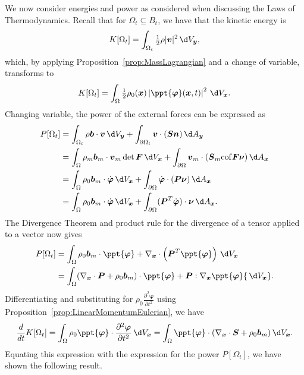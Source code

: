 \documentclass[
  letterpaper,
  DIV=11,
  numbers=noendperiod]{scrreprt}
\theoremstyle{plain}
\theoremstyle{remark}
\begin{document}
We now consider energies and power as considered when discussing the
Laws of Thermodynamics. Recall that for \(\Omega_t\subseteq B_t\), we
have that the kinetic energy is
\[K[\Omega_t] = \int_{\Omega_t}\tfrac12\rho|{\boldsymbol{v}}|^2{\,\d V_{{\boldsymbol{y}}}},\]
which, by applying
Proposition~\hyperref[prop:MassLagrangian]{{[}prop:MassLagrangian{]}}
and a change of variable, transforms to
\[K[\Omega_t] = \int_\Omega \tfrac12\rho_0({\boldsymbol{x}})\left|\ppt{\boldsymbol{\varphi}}({\boldsymbol{x}},t)\right|^2{\,\d V_{{\boldsymbol{x}}}}.\]
Changing variable, the power of the external forces can be expressed as
\[\begin{aligned}
  P[\Omega_t]
  &= \int_{\Omega_t}\rho{\boldsymbol{b}}\cdot{\boldsymbol{v}}{\,\d V_{{\boldsymbol{y}}}}+\int_{\partial\Omega_t}{\boldsymbol{v}}\cdot({\boldsymbol{S}}{\boldsymbol{n}}){\,\d A_{{\boldsymbol{y}}}}\\
  &= \int_{\Omega}\rho_m{\boldsymbol{b}}_m\cdot{\boldsymbol{v}}_m\det{\boldsymbol{F}}{\,\d V_{{\boldsymbol{x}}}}+\int_{\partial\Omega}{\boldsymbol{v}}_m\cdot({\boldsymbol{S}}_m{\operatorname{cof}}{\boldsymbol{F}}{\boldsymbol{\nu}}){\,\d A_{{\boldsymbol{x}}}}\\
  &= \int_{\Omega}\rho_0{\boldsymbol{b}}_m\cdot\dot{\boldsymbol{\varphi}}{\,\d V_{{\boldsymbol{x}}}}+\int_{\partial\Omega}\dot{\boldsymbol{\varphi}}\cdot({\boldsymbol{P}}{\boldsymbol{\nu}}){\,\d A_{{\boldsymbol{x}}}}\\
  &= \int_{\Omega}\rho_0{\boldsymbol{b}}_m\cdot\dot{\boldsymbol{\varphi}}{\,\d V_{{\boldsymbol{x}}}}+\int_{\partial\Omega}({\boldsymbol{P}}^T\dot{\boldsymbol{\varphi}})\cdot{\boldsymbol{\nu}}{\,\d A_{{\boldsymbol{x}}}}.
\end{aligned}\] The Divergence Theorem and product rule for the
divergence of a tensor applied to a vector now gives \[\begin{aligned}
  P[\Omega_t]
  &= \int_{\Omega}\rho_0{\boldsymbol{b}}_m\cdot\ppt{\boldsymbol{\varphi}}+\nabla_{\boldsymbol{x}}\cdot\left({\boldsymbol{P}}^T\ppt{\boldsymbol{\varphi}}\right){\,\d V_{{\boldsymbol{x}}}}\\
  &=\int_{\Omega}(\nabla_{\boldsymbol{x}}\cdot{\boldsymbol{P}}+\rho_0{\boldsymbol{b}}_m)\cdot\ppt{\boldsymbol{\varphi}}+{\boldsymbol{P}}:\nabla_{\boldsymbol{x}}\ppt{\boldsymbol{\varphi}}{\,\d V_{{\boldsymbol{x}}}}.
\end{aligned}\] Differentiating and substituting for
\(\rho_0\frac{\partial^2{\boldsymbol{\varphi}}}{\partial t^2}\) using
Proposition~\hyperref[prop:LinearMomentumEulerian]{{[}prop:LinearMomentumEulerian{]}},
we have
\[\frac{d}{dt}K[\Omega_t] = \int_{\Omega}\rho_0\ppt{\boldsymbol{\varphi}}\cdot\frac{\partial^2{\boldsymbol{\varphi}}}{\partial t^2}{\,\d V_{{\boldsymbol{x}}}}=
  \int_{\Omega}\ppt{\boldsymbol{\varphi}}\cdot(\nabla_{\boldsymbol{x}}\cdot{\boldsymbol{S}}+\rho_0{\boldsymbol{b}}_m){\,\d V_{{\boldsymbol{x}}}}.\]
Equating this expression with the expression for the power
\(P[\Omega_t]\), we have shown the following result.
\end{document}
